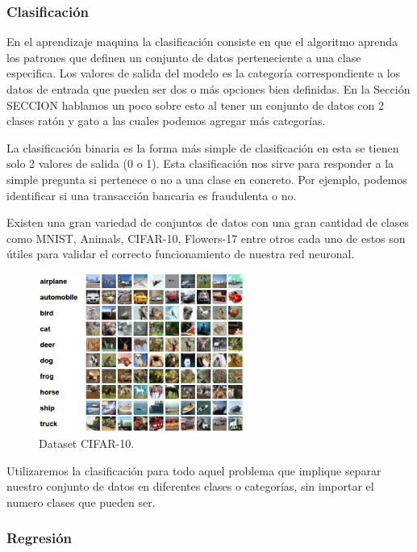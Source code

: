 \subsubsection{Clasificación}

En el aprendizaje maquina la clasificación consiste en que el algoritmo aprenda los patrones que definen un conjunto de datos perteneciente a una clase especifica. Los valores de salida del modelo es la categoría correspondiente a los datos de entrada que pueden ser dos o más opciones bien definidas. En la Sección SECCION hablamos un poco sobre esto al tener un conjunto de datos con 2 clases ratón y gato a las cuales podemos agregar más categorías.

La clasificación binaria es la forma más simple de clasificación en esta se tienen solo 2 valores de salida (0 o 1). Esta clasificación nos sirve para responder a la simple pregunta si pertenece o no a una clase en concreto. Por ejemplo, podemos identificar si una transacción bancaria es fraudulenta o no.

Existen una gran variedad de conjuntos de datos con una gran cantidad de clases como MNIST, Animals, CIFAR-10, Flowers-17 entre otros cada uno de estos son útiles para validar el correcto funcionamiento de nuestra red neuronal.

\begin{figure}[H]
    \centering
    \includegraphics[width=0.6\textwidth]{MarcoTeorico/imgs/CIFAR-10.png}
    \caption{Dataset CIFAR-10.}
    \label{fig:cifar10}
\end{figure}

Utilizaremos la clasificación para todo aquel problema que implique separar nuestro conjunto de datos en diferentes clases o categorías, sin importar el numero clases que pueden ser.

\subsubsection{Regresión}

